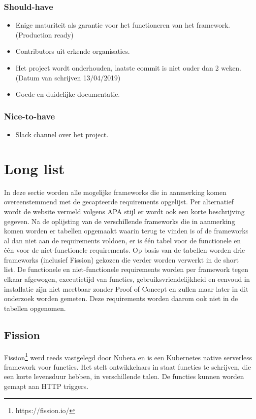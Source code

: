 \subsubsection{Should-have}
\begin{itemize}
    \item Enige maturiteit als garantie voor het functioneren van het framework. (Production ready)
    \item Contributors uit erkende organisaties.
    \item Het project wordt onderhouden, laatste commit is niet ouder dan 2 weken. (Datum van schrijven 13/04/2019)
    \item Goede en duidelijke documentatie.
\end{itemize}
\subsubsection{Nice-to-have}
\begin{itemize}
    \item Slack channel over het project.
\end{itemize}

\section{Long list}
In deze sectie worden alle mogelijke frameworks die in aanmerking komen overeenstemmend met de gecapteerde requirements opgelijst. Per alternatief wordt de website vermeld volgens APA stijl er wordt ook een korte beschrijving gegeven. Na de oplijsting van de verschillende frameworks die in aanmerking komen worden er tabellen opgemaakt waarin terug te vinden is of de frameworks al dan niet aan de requirements voldoen, er is één tabel voor de functionele en één voor de niet-functionele requirements. Op basis van de tabellen worden drie frameworks (inclusief Fission) gekozen die verder worden verwerkt in de short list. De functionele en niet-functionele requirements worden per framework tegen elkaar afgewogen, executietijd van functies, gebruiksvriendelijkheid en eenvoud in installatie zijn niet meetbaar zonder Proof of Concept en zullen maar later in dit onderzoek worden gemeten. Deze requirements worden daarom ook niet in de tabellen opgenomen.

\subsection{Fission}
Fission\footnote{https://fission.io/} werd reeds vastgelegd door Nubera en is een Kubernetes native serverless framework voor functies. Het stelt ontwikkelaars in staat functies te schrijven, die een korte levensduur hebben, in verschillende talen. De functies kunnen worden gemapt aan HTTP triggers.

